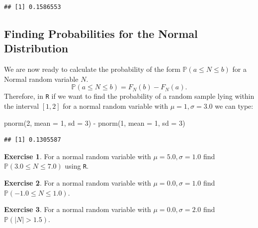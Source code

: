 \documentclass[
]{book}
\newenvironment{Shaded}{\begin{snugshade}}{\end{snugshade}}
\newcommand{\AttributeTok}[1]{\textcolor[rgb]{0.77,0.63,0.00}{#1}}
\newcommand{\DecValTok}[1]{\textcolor[rgb]{0.00,0.00,0.81}{#1}}
\newcommand{\FunctionTok}[1]{\textcolor[rgb]{0.00,0.00,0.00}{#1}}
\newcommand{\NormalTok}[1]{#1}
\newcommand{\SpecialCharTok}[1]{\textcolor[rgb]{0.00,0.00,0.00}{#1}}
\theoremstyle{definition}
\theoremstyle{definition}
\theoremstyle{definition}
\newtheorem{exercise}{Exercise}[chapter]
\theoremstyle{definition}
\theoremstyle{remark}
\begin{document}
\begin{verbatim}
## [1] 0.1586553
\end{verbatim}

\hypertarget{finding-probabilities-for-the-normal-distribution}{%
\subsection{Finding Probabilities for the Normal Distribution}\label{finding-probabilities-for-the-normal-distribution}}

We are now ready to calculate the probability of the form \(\mathbb{P}(a \leq N \leq b)\) for a Normal random variable \(N\). \[\mathbb{P}(a \leq N \leq b)=F_N(b)-F_N(a).\] Therefore, in \texttt{R} if we want to find the probability of a random sample lying within the interval \([1,2]\) for a normal random variable with \(\mu=1, \sigma=3.0\) we can type:

\begin{Shaded}
\begin{Highlighting}[]
\FunctionTok{pnorm}\NormalTok{(}\DecValTok{2}\NormalTok{, }\AttributeTok{mean =} \DecValTok{1}\NormalTok{, }\AttributeTok{sd =} \DecValTok{3}\NormalTok{) }\SpecialCharTok{{-}} \FunctionTok{pnorm}\NormalTok{(}\DecValTok{1}\NormalTok{, }\AttributeTok{mean =} \DecValTok{1}\NormalTok{, }\AttributeTok{sd =} \DecValTok{3}\NormalTok{)}
\end{Highlighting}
\end{Shaded}

\begin{verbatim}
## [1] 0.1305587
\end{verbatim}

\begin{exercise}
\protect\hypertarget{exr:unnamed-chunk-300}{}\label{exr:unnamed-chunk-300}For a normal random variable with \(\mu=5.0, \sigma=1.0\) find \(\mathbb{P}(3.0 \leq N \leq 7.0)\) using \texttt{R}.
\end{exercise}

\begin{exercise}
\protect\hypertarget{exr:unnamed-chunk-301}{}\label{exr:unnamed-chunk-301}For a normal random variable with \(\mu=0.0, \sigma=1.0\) find \(\mathbb{P}(-1.0 \leq N \leq 1.0)\).
\end{exercise}

\begin{exercise}
\protect\hypertarget{exr:unnamed-chunk-302}{}\label{exr:unnamed-chunk-302}For a normal random variable with \(\mu=0.0, \sigma=2.0\) find \(\mathbb{P}(|N|>1.5)\).
\end{exercise}
\end{document}
